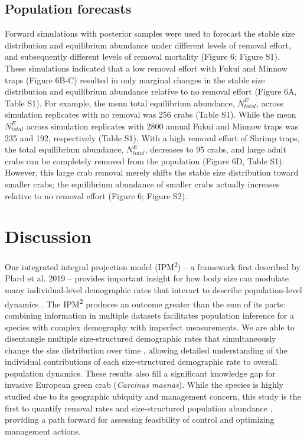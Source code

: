 \documentclass{article}
\begin{document}
\subsection{Population forecasts}

Forward simulations with posterior samples were used to forecast the stable size distribution and equilibrium abundance under different levels of removal effort, and subsequently different levels of removal mortality (Figure 6; Figure S1). These simulations indicated that a low removal effort with Fukui and Minnow traps (Figure 6B-C) resulted in only marginal changes in the stable size distribution and equilibrium abundance relative to no removal effort (Figure 6A, Table S1). For example, the mean total equilibrium abundance, $N_{total}^{E}$, across simulation replicates with no removal was 256 crabs (Table S1). While the mean $N_{total}^{E}$ across simulation replicates with 2800 annual Fukui and Minnow traps was 235 and 192, respectively (Table S1). With a high removal effort of Shrimp traps, the total equilibrium abundance, $N_{total}^{E}$, decreases to 95 crabs, and large adult crabs can be completely removed from the population (Figure 6D, Table S1). However, this large crab removal merely shifts the stable size distribution toward smaller crabs; the equilibrium abundance of smaller crabs actually increases relative to no removal effort (Figure 6; Figure S2).

\section{Discussion}

Our integrated integral projection model (IPM\textsuperscript{2}) – a framework first described by Plard et al. 2019 – provides important insight for how body size can modulate many individual-level demographic rates that interact to describe population-level dynamics \parencite{plard2019ipm}. The IPM\textsuperscript{2} produces an outcome greater than the sum of its parts: combining information in multiple datasets facilitates population inference for a species with complex demography with imperfect measurements. We are able to disentangle multiple size-structured demographic rates that simultaneously change the size distribution over time \parencite{sogard1997size, carlson2010bayesian}, allowing detailed understanding of the individual contributions of each size-structured demographic rate to overall population dynamics. These results also fill a significant knowledge gap for invasive European green crab (\textit{Carcinus maenas}). While the species is highly studied due to its geographic ubiquity and management concern, this study is the first to quantify removal rates and size-structured population abundance \parencite{young2019life}, providing a path forward for assessing feasibility of control and optimizing management actions.
\end{document}

